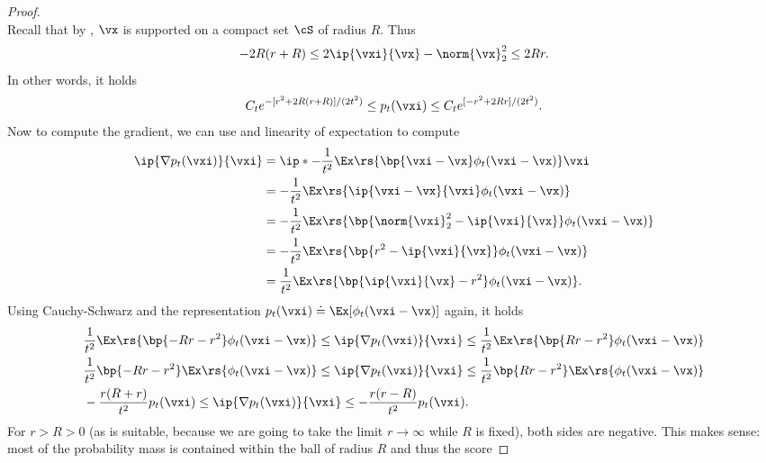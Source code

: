 \documentclass[../../book-main.tex]{subfiles}
\begin{document}
\begin{proof}
\begin{equation}
    \end{equation}
    Recall that by ,
    \(\vx\) is supported on a compact set \(\cS\) of radius \(R\). Thus
    \begin{equation}
        -2R(r + R) \leq 2\ip{\vxi}{\vx} - \norm{\vx}_{2}^{2} \leq 2Rr.
    \end{equation}
    In other words, it holds
    \begin{equation}
        C_{t}e^{-[r^{2} + 2R(r + R)]/(2t^{2})} \leq p_{t}(\vxi) \leq
        C_{t}e^{[-r^{2} + 2Rr]/(2t^{2})}.
    \end{equation}
    Now to compute the gradient, we can use
     and linearity of expectation to compute
    \begin{align}
        \ip{\nabla p_{t}(\vxi)}{\vxi}
        &= \ip*{-\frac{1}{t^{2}}\Ex\rs{\bp{\vxi - \vx}\phi_{t}(\vxi -
        \vx)}}{\vxi} \\
        &= -\frac{1}{t^{2}}\Ex\rs{\ip{\vxi - \vx}{\vxi}\phi_{t}(\vxi - \vx)} \\
        &= -\frac{1}{t^{2}}\Ex\rs{\bp{\norm{\vxi}_{2}^{2} -
        \ip{\vxi}{\vx}}\phi_{t}(\vxi - \vx)} \\
        &= -\frac{1}{t^{2}}\Ex\rs{\bp{r^{2} -
        \ip{\vxi}{\vx}}\phi_{t}(\vxi - \vx)} \\
        &= \frac{1}{t^{2}}\Ex\rs{\bp{\ip{\vxi}{\vx} -
        r^{2}}\phi_{t}(\vxi - \vx)}.
    \end{align}
    Using Cauchy-Schwarz and the representation \(p_{t}(\vxi) \doteq
    \Ex[\phi_{t}(\vxi - \vx)]\) again, it holds
    \begin{align}
        &\frac{1}{t^{2}}\Ex\rs{\bp{-Rr - r^{2}}\phi_{t}(\vxi - \vx)}
        \leq \ip{\nabla p_{t}(\vxi)}{\vxi} \leq
        \frac{1}{t^{2}}\Ex\rs{\bp{Rr - r^{2}}\phi_{t}(\vxi - \vx)} \\
        &\frac{1}{t^{2}}\bp{-Rr - r^{2}}\Ex\rs{\phi_{t}(\vxi - \vx)}
        \leq \ip{\nabla p_{t}(\vxi)}{\vxi} \leq \frac{1}{t^{2}}\bp{Rr
        - r^{2}}\Ex\rs{\phi_{t}(\vxi - \vx)} \\
        &-\frac{r(R + r)}{t^{2}}p_{t}(\vxi) \leq \ip{\nabla
        p_{t}(\vxi)}{\vxi} \leq -\frac{r(r - R)}{t^{2}}p_{t}(\vxi).
    \end{align}
    For \(r > R > 0\) (as is suitable, because we are going to take
    the limit \(r \to \infty\) while \(R\) is fixed), both sides are
    negative. This makes sense: most of the probability mass is
    contained within the ball of radius \(R\) and thus the score

\end{proof}
\end{document}
